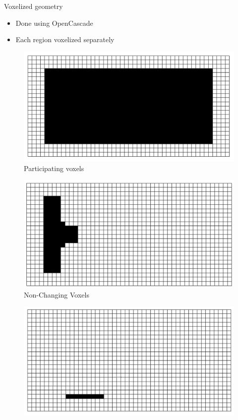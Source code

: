 \begin{frame}{Voxelized geometry}
\begin{itemize}
\item Done using OpenCascade  
\item Each region voxelized separately 
\end{itemize}
\vspace{0.4cm}
\begin{minipage}{0.49\textwidth}
\begin{figure}
\includegraphics[width=.7\textwidth]{Pictures/Voxels/Active_2.png}
\vspace*{-2mm}
\caption{Participating voxels}
\end{figure}
\vspace{-0.6cm}
 \begin{figure}
\includegraphics[width=.7\textwidth]{Pictures/Voxels/NonChanging.png}
\vspace*{-2mm}
\caption{Non-Changing Voxels}
\end{figure}
\end{minipage}
\hfill
\begin{minipage}{0.49\textwidth}
\begin{figure}
\includegraphics[width=.7\textwidth]{Pictures/Voxels/Fixture.png}

\end{figure}
\end{minipage}
\end{frame}
